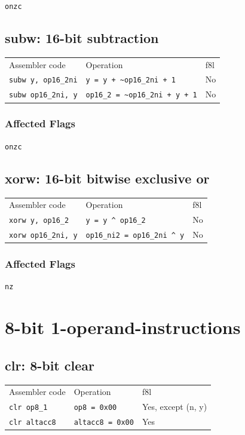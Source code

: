 \documentclass{book}
\begin{document}
\texttt{onzc}


\subsection{subw: 16-bit subtraction}

\begin{tabular}{l l l}
Assembler code              & Operation                                & f8l \\
\texttt{subw y, op16\_2ni}  & \texttt{y = y + \~{}op16\_2ni + 1}       & No \\
\texttt{subw op16\_2ni, y}  & \texttt{op16\_2 = \~{}op16\_2ni + y + 1} & No
\end{tabular}

\subsubsection*{Affected Flags}

\texttt{onzc}


\subsection{xorw: 16-bit bitwise exclusive or}

\begin{tabular}{l l l}
Assembler code              & Operation                             & f8l \\
\texttt{xorw y, op16\_2}    & \texttt{y = y \^{} op16\_2}           & No \\
\texttt{xorw op16\_2ni, y}  & \texttt{op16\_ni2 = op16\_2ni \^{} y} & No
\end{tabular}

\subsubsection*{Affected Flags}

\texttt{nz}


\section{8-bit 1-operand-instructions}

\subsection{clr: 8-bit clear}

\begin{tabular}{l l l}
Assembler code       & Operation               & f8l \\
\texttt{clr op8\_1}  & \texttt{op8 = 0x00}     & Yes, except (n, y) \\
\texttt{clr altacc8} & \texttt{altacc8 = 0x00} & Yes
\end{tabular}
\end{document}
